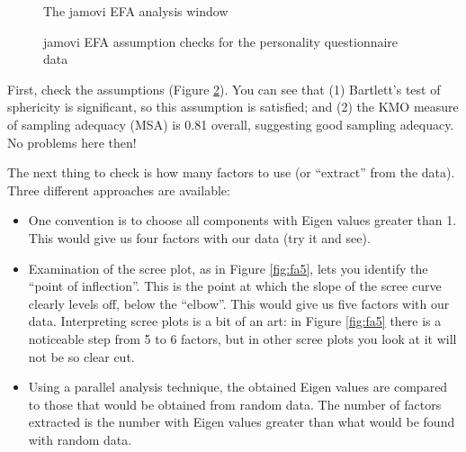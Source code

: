 \begin{figure}[!htb]
\begin{center}
\caption{The jamovi EFA analysis window}
\label{fig:fa3}
\HR
\end{center}
\end{figure}

\begin{figure}[p]
\begin{center}
\caption{jamovi EFA assumption checks for the personality questionnaire data}
\label{fig:fa4}
\HR
\end{center}
\end{figure}

First, check the assumptions (Figure \ref{fig:fa4}). You can see that (1) Bartlett’s test of sphericity is significant, so this assumption is satisfied; and (2) the KMO measure of sampling adequacy (MSA) is 0.81 overall, suggesting good sampling adequacy. No problems here then! 

The next thing to check is how many factors to use (or “extract” from the data). Three different approaches are available:

\begin{itemize} \itemsep -2pt
\item One convention is to choose all components with Eigen values greater than 1. This would give us four factors with our data (try it and see). 
\item Examination of the scree plot, as in Figure \ref{fig:fa5}, lets you identify the “point of inflection”. This is the point at which the slope of the scree curve clearly levels off, below the “elbow”. This would give us five factors with our data. Interpreting scree plots is a bit of an art: in Figure \ref{fig:fa5} there is a noticeable step from 5 to 6 factors, but in other scree plots you look at it will not be so clear cut.
\item Using a parallel analysis technique, the obtained Eigen values are compared to those that would be obtained from random data. The number of factors extracted is the number with Eigen values greater than what would be found with random data. 
\end{itemize}

